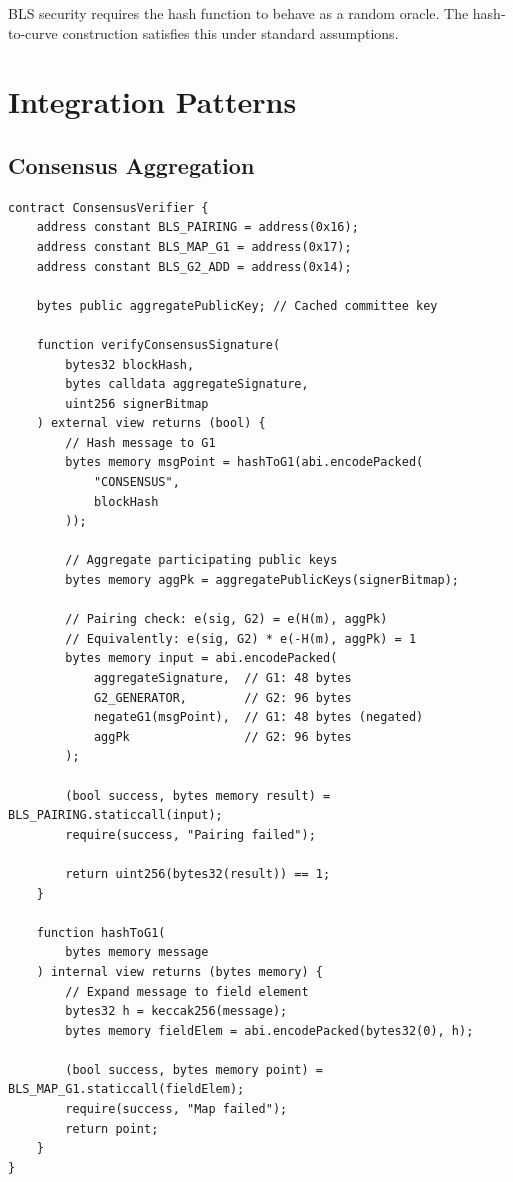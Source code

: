 \documentclass[11pt,a4paper]{article}
\theoremstyle{definition}
\begin{document}
BLS security requires the hash function to behave as a random oracle. The hash-to-curve construction satisfies this under standard assumptions.

\section{Integration Patterns}

\subsection{Consensus Aggregation}

\begin{lstlisting}[language=Solidity]
contract ConsensusVerifier {
    address constant BLS_PAIRING = address(0x16);
    address constant BLS_MAP_G1 = address(0x17);
    address constant BLS_G2_ADD = address(0x14);

    bytes public aggregatePublicKey; // Cached committee key

    function verifyConsensusSignature(
        bytes32 blockHash,
        bytes calldata aggregateSignature,
        uint256 signerBitmap
    ) external view returns (bool) {
        // Hash message to G1
        bytes memory msgPoint = hashToG1(abi.encodePacked(
            "CONSENSUS",
            blockHash
        ));

        // Aggregate participating public keys
        bytes memory aggPk = aggregatePublicKeys(signerBitmap);

        // Pairing check: e(sig, G2) = e(H(m), aggPk)
        // Equivalently: e(sig, G2) * e(-H(m), aggPk) = 1
        bytes memory input = abi.encodePacked(
            aggregateSignature,  // G1: 48 bytes
            G2_GENERATOR,        // G2: 96 bytes
            negateG1(msgPoint),  // G1: 48 bytes (negated)
            aggPk                // G2: 96 bytes
        );

        (bool success, bytes memory result) = BLS_PAIRING.staticcall(input);
        require(success, "Pairing failed");

        return uint256(bytes32(result)) == 1;
    }

    function hashToG1(
        bytes memory message
    ) internal view returns (bytes memory) {
        // Expand message to field element
        bytes32 h = keccak256(message);
        bytes memory fieldElem = abi.encodePacked(bytes32(0), h);

        (bool success, bytes memory point) = BLS_MAP_G1.staticcall(fieldElem);
        require(success, "Map failed");
        return point;
    }
}
\end{lstlisting}
\end{document}
